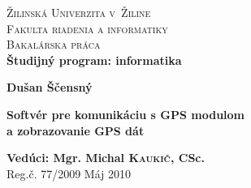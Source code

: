 
\begin{titlepage}
\begin{center}

\textsc{\LARGE Žilinská Univerzita v~Žiline\\ Fakulta riadenia a informatiky}\\[3.5cm]%

\textsc{\Large Bakalárska práca}\\[0.5cm]
{ \large \bfseries Študijný program: informatika}\\[1.5cm]%
\end{center}

\vfill
\begin{center}
\textbf{Dušan Ščensný}\\
\end{center}
\begin{center}
\textbf{Softvér pre komunikáciu s GPS modulom} \\
\textbf{a zobrazovanie GPS dát}\\
\end{center}
\begin{center}
\textbf{Vedúci: Mgr. Michal \textsc{Kaukič}, CSc.}\\ 
Reg.č. 77/2009 \hspace{3.0cm}    Máj 2010\\
\hspace{2cm}\\
\end{center}
\end{titlepage}

